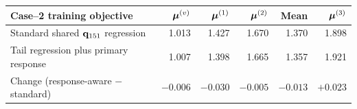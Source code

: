 \begin{tabular}{lrrrrr}
\toprule
Case--2 training objective & $\bm\mu^{(v)}$ & $\bm\mu^{(1)}$ & $\bm\mu^{(2)}$ & Mean & $\bm\mu^{(3)}$ \\
\midrule
Standard shared $\mathbf q_{151}$ regression & 1.013 & 1.427 & 1.670 & 1.370 & 1.898 \\
Tail regression plus primary response & 1.007 & 1.398 & 1.665 & 1.357 & 1.921 \\
\midrule
Change (response-aware $-$ standard) & $-0.006$ & $-0.030$ & $-0.005$ & $-0.013$ & $+0.023$ \\
\bottomrule
\end{tabular}
